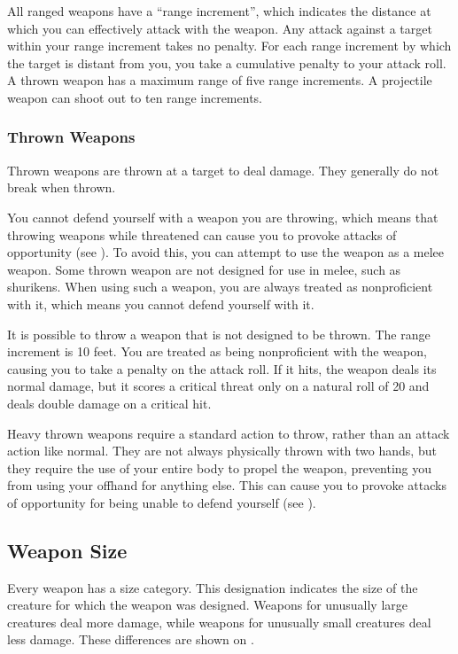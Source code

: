  All ranged weapons have a ``range increment'', which indicates the distance at which you can effectively attack with the weapon. Any attack against a target within your range increment takes no penalty. For each range increment by which the target is distant from you, you take a cumulative  penalty to your attack roll. A thrown weapon has a maximum range of five range increments. A projectile weapon can shoot out to ten range increments.

\subsubsection{Thrown Weapons}\label{Thrown Weapons} Thrown weapons are thrown at a target to deal damage. They generally do not break when thrown.

\label{Thrown Weapons in Melee} You cannot defend yourself with a weapon you are throwing, which means that throwing weapons while threatened can cause you to provoke attacks of opportunity (see ). To avoid this, you can attempt to use the weapon as a melee weapon. Some thrown weapon are not designed for use in melee, such as shurikens. When using such a weapon, you are always treated as nonproficient with it, which means you cannot defend yourself with it.

 It is possible to throw a weapon that is not designed to be thrown. The range increment is 10 feet. You are treated as being nonproficient with the weapon, causing you to take a  penalty on the attack roll. If it hits, the weapon deals its normal damage, but it scores a critical threat only on a natural roll of 20 and deals double damage on a critical hit.

 Heavy thrown weapons require a standard action to throw, rather than an attack action like normal. They are not always physically thrown with two hands, but they require the use of your entire body to propel the weapon, preventing you from using your offhand for anything else. This can cause you to provoke attacks of opportunity for being unable to defend yourself (see ).

\subsection{Weapon Size} Every weapon has a size category. This designation indicates the size of the creature for which the weapon was designed. Weapons for unusually large creatures deal more damage, while weapons for unusually small creatures deal less damage. These differences are shown on .

